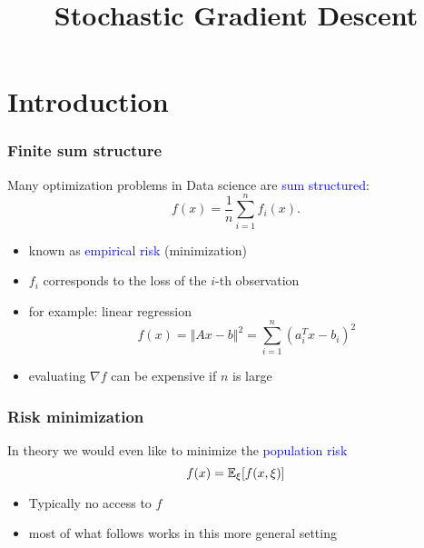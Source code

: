 \documentclass{beamer}
\title{Stochastic Gradient Descent}
\begin{document}
\maketitle
\frame{\tableofcontents}

\section{Introduction}%
\label{sec:}

\begin{frame}
  \frametitle{Finite sum structure}

  Many optimization problems in Data science are \textcolor{blue}{sum structured}:
  \begin{equation}
    f(x) = \frac{1}{n} \sum_{i=1}^{n} f_i(x).
  \end{equation}

  \begin{itemize}
    \item known as \textcolor{blue}{empirical risk} (minimization)
    \item $f_i$ corresponds to the loss of the $i$-th observation
    \item for example: linear regression
          \begin{equation}
            f(x) = \Vert Ax-b \Vert^2 = \sum_{i=1}^{n} {(a_i^T x -b_i)}^2
          \end{equation}
    \item evaluating $\nabla f$ can be expensive if $n$ is large
  \end{itemize}
  
\end{frame}


\begin{frame}
  \frametitle{Risk minimization}
  In theory we would even like to minimize the \textcolor{blue}{population risk}
  \begin{equation}
    f(x) = \mathbb{E}_\xi [ f(x, \xi) ]
  \end{equation}
  \begin{itemize}
    \item Typically no access to $f$
    \item most of what follows works in this more general setting
  \end{itemize}
\end{frame}
\end{document}
